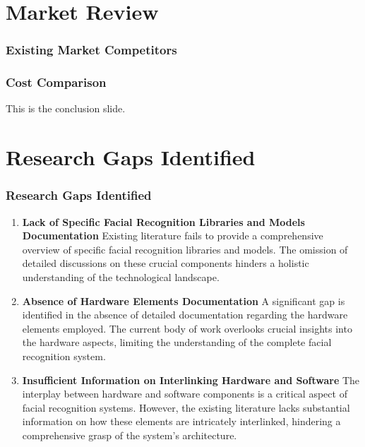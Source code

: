 \documentclass[aspectratio=169]{beamer}
\begin{document}
\section{Market Review}
\begin{frame}
	\frametitle{Existing Market Competitors}

\end{frame}

\begin{frame}
	\frametitle{Cost Comparison}
	This is the conclusion slide.
\end{frame}

\section{Research Gaps Identified}
\begin{frame}
	\frametitle{Research Gaps Identified}
  \begin{minipage}{0.95\textwidth}
	\begin{enumerate}
		\item \textbf{Lack of Specific Facial Recognition Libraries and Models Documentation}
		      Existing literature fails to provide a comprehensive overview of specific facial recognition libraries and models. The omission of detailed discussions on these crucial components hinders a holistic understanding of the technological landscape.
		\item \textbf{Absence of Hardware Elements Documentation}
		      A significant gap is identified in the absence of detailed documentation regarding the hardware elements employed. The current body of work overlooks crucial insights into the hardware aspects, limiting the understanding of the complete facial recognition system.
		\item \textbf{Insufficient Information on Interlinking Hardware and Software}
		      The interplay between hardware and software components is a critical aspect of facial recognition systems. However, the existing literature lacks substantial information on how these elements are intricately interlinked, hindering a comprehensive grasp of the system's architecture.
	\end{enumerate}
\end{minipage}
  
\end{frame}
\end{document}
